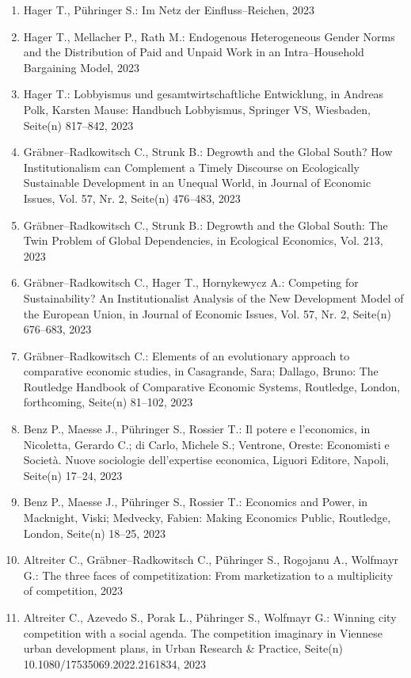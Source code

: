 \begin{enumerate}
	 \item Hager T., Pühringer S.: Im Netz der Einfluss--Reichen, 2023
	 \item Hager T., Mellacher P., Rath M.: Endogenous Heterogeneous Gender Norms and the Distribution of Paid and Unpaid Work in an Intra--Household Bargaining Model, 2023
	 \item Hager T.: Lobbyismus und gesamtwirtschaftliche Entwicklung, in Andreas Polk, Karsten Mause: Handbuch Lobbyismus, Springer VS, Wiesbaden, Seite(n) 817–842, 2023
	 \item Gräbner--Radkowitsch C., Strunk B.: Degrowth and the Global South? How Institutionalism can Complement a Timely Discourse on Ecologically Sustainable Development in an Unequal World, in Journal of Economic Issues, Vol. 57, Nr. 2, Seite(n) 476--483, 2023
	 \item Gräbner--Radkowitsch C., Strunk B.: Degrowth and the Global South: The Twin Problem of Global Dependencies, in Ecological Economics, Vol. 213, 2023
	 \item Gräbner--Radkowitsch C., Hager T., Hornykewycz A.: Competing for Sustainability? An Institutionalist Analysis of the New Development Model of the European Union, in Journal of Economic Issues, Vol. 57, Nr. 2, Seite(n) 676--683, 2023
	 \item Gräbner--Radkowitsch C.: Elements of an evolutionary approach to comparative economic studies, in Casagrande, Sara; Dallago, Bruno: The Routledge Handbook of Comparative Economic Systems, Routledge, London, forthcoming, Seite(n) 81--102, 2023
	 \item Benz P., Maesse J., Pühringer S., Rossier T.: Il potere e l'economics, in Nicoletta, Gerardo C.; di Carlo, Michele S.; Ventrone, Oreste: Economisti e Società. Nuove sociologie dell'expertise economica, Liguori Editore, Napoli, Seite(n) 17--24, 2023
	 \item Benz P., Maesse J., Pühringer S., Rossier T.: Economics and Power, in Macknight, Viski; Medvecky, Fabien: Making Economics Public, Routledge, London, Seite(n) 18--25, 2023
	 \item Altreiter C., Gräbner--Radkowitsch C., Pühringer S., Rogojanu A., Wolfmayr G.: The three faces of competitization: From marketization to a multiplicity of competition, 2023
	 \item Altreiter C., Azevedo S., Porak L., Pühringer S., Wolfmayr G.: Winning city competition with a social agenda. The competition imaginary in Viennese urban development plans, in Urban Research \& Practice, Seite(n) 10.1080/17535069.2022.2161834, 2023

\end{enumerate}
